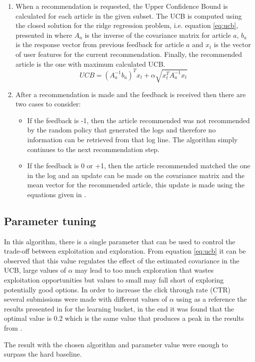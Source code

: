 \documentclass[a4paper, 11pt]{article}
\begin{document}
\begin{enumerate}
	\item When a recommendation is requested, the Upper Confidence Bound is calculated for each article in the given subset. The UCB is computed using the closed solution for the ridge regression problem, i.e. equation \ref{eq:ucb}, presented in \cite{li2010contextual} where $A_a$ is the inverse of the covariance matrix for article $a$, $b_a$ is the response vector from previous feedback for article $a$ and $x_t$ is the vector of user features for the current recommendation. Finally, the recommended article is the one with maximum calculated UCB.
	\begin{equation}
		\label{eq:ucb}
		UCB = (A^{-1}_{a}b_{a})^{T}x_{t} + \alpha\sqrt{x_{t}^{T}A^{-1}_{a}x_{t}}
	\end{equation}
	\item After a recommendation is made and the feedback is received then there are two cases to consider:
		\begin{itemize}
			\item If the feedback is -1, then the article recommended was not recommended by the random policy that generated the logs and therefore no information can be retrieved from that log line. The algorithm simply continues to the next recommendation step.
			\item If the feedback is 0 or +1, then the article recommended matched the one in the log and an update can be made on the covariance matrix and the mean vector for the recommended article, this update is made using the equations given in \cite{li2010contextual}.
		\end{itemize}
\end{enumerate}

\subsection{Parameter tuning}

In this algorithm, there is a single parameter that can be used to control the trade-off between exploitation and exploration. From equation \ref{eq:ucb} it can be observed that this value regulates the effect of the estimated covariance in the UCB, large values of $\alpha$ may lead to too much exploration that wastes exploitation opportunities but values to small may fall short of exploring potentially good options. In order to increase the click through rate (CTR) several submissions were made with different values of $\alpha$ using as a reference the results presented in \cite{li2010contextual} for the learning bucket, in the end it was found that the optimal value is 0.2 which is the same value that produces a peak in the results from \cite{li2010contextual}.

The result with the chosen algorithm and parameter value were enough to surpass the hard baseline.



\end{document}
